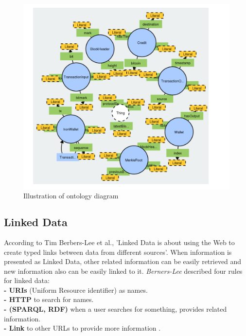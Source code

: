 \begin{center}
	
	
	\begin{figure}[htb!]
		
		\begin{minipage}{0.55\linewidth}
			\centering
			\includegraphics[width=1.65\textwidth]{images/chap02_diagram_ontology.png}
		\end{minipage}
		\caption[Illustration of ontology diagram]{Illustration of ontology diagram \cite{Matthew}}
		
		
	\end{figure}
	
\end{center}

\subsection{Linked Data}
According to Tim Berbers-Lee et al.\cite{Tim}, 'Linked Data is about using the Web to create typed links between data
from different sources'. When information
is presented as Linked Data, other related information can be easily retrieved and new information also can be easily linked to it. \textit{Berners-Lee} described four rules for linked data:\\
\textbf{- URIs} (Uniform Resource identifier) as names.\\ 
\textbf{- HTTP} to search for names.\\
\textbf{- (SPARQL, RDF)}  when a user searches for something, provides related information.\\
\textbf{- Link} to other URLs to provide more information \cite{Hector}.\\

